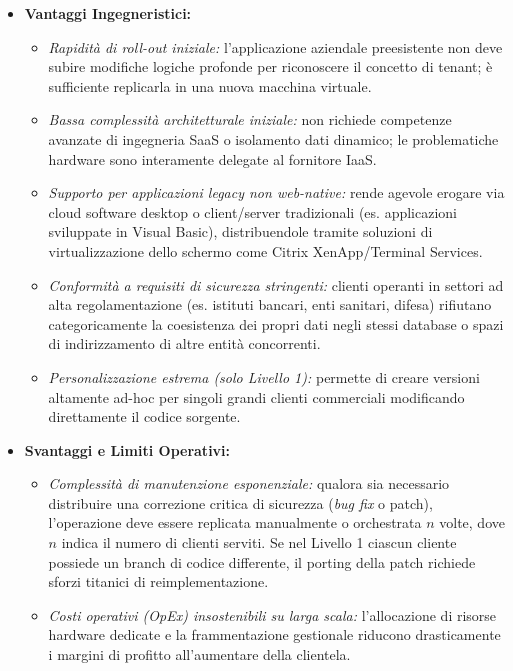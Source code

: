 \documentclass[11pt, a4paper]{article}
\begin{document}
\begin{itemize}
    \item \textbf{Vantaggi Ingegneristici:}
    \begin{itemize}[noitemsep]
        \item \emph{Rapidità di roll-out iniziale:} l'applicazione aziendale preesistente non deve subire modifiche logiche profonde per riconoscere il concetto di tenant; è sufficiente replicarla in una nuova macchina virtuale.
        \item \emph{Bassa complessità architetturale iniziale:} non richiede competenze avanzate di ingegneria SaaS o isolamento dati dinamico; le problematiche hardware sono interamente delegate al fornitore IaaS.
        \item \emph{Supporto per applicazioni legacy non web-native:} rende agevole erogare via cloud software desktop o client/server tradizionali (es. applicazioni sviluppate in Visual Basic), distribuendole tramite soluzioni di virtualizzazione dello schermo come Citrix XenApp/Terminal Services.
        \item \emph{Conformità a requisiti di sicurezza stringenti:} clienti operanti in settori ad alta regolamentazione (es. istituti bancari, enti sanitari, difesa) rifiutano categoricamente la coesistenza dei propri dati negli stessi database o spazi di indirizzamento di altre entità concorrenti.
        \item \emph{Personalizzazione estrema (solo Livello 1):} permette di creare versioni altamente ad-hoc per singoli grandi clienti commerciali modificando direttamente il codice sorgente.
    \end{itemize}

    \item \textbf{Svantaggi e Limiti Operativi:}
    \begin{itemize}[noitemsep]
        \item \emph{Complessità di manutenzione esponenziale:} qualora sia necessario distribuire una correzione critica di sicurezza (\emph{bug fix} o patch), l'operazione deve essere replicata manualmente o orchestrata $n$ volte, dove $n$ indica il numero di clienti serviti. Se nel Livello 1 ciascun cliente possiede un branch di codice differente, il porting della patch richiede sforzi titanici di reimplementazione.
        \item \emph{Costi operativi (OpEx) insostenibili su larga scala:} l'allocazione di risorse hardware dedicate e la frammentazione gestionale riducono drasticamente i margini di profitto all'aumentare della clientela.
    \end{itemize}
\end{itemize}
\end{document}
